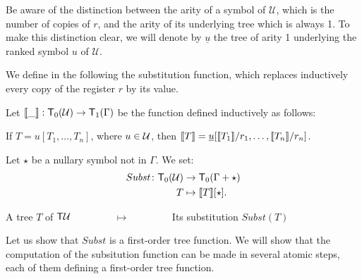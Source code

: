 Be aware of the distinction between the arity of a symbol of $\mathcal{U}$, which is the number of copies of $r$, and the arity of its underlying tree which is always 1. To make this distinction clear, we will denote by $\underline{u}$ the tree of arity 1 underlying the ranked symbol $u$ of $\mathcal{U}$. 

We define in the following the substitution function, which replaces inductively every copy of the register $r$ by its value.
\begin{definition}
Let $\llbracket \_ \rrbracket:\mathsf T_0({\mathcal U})\to \mathsf T_1(\Gamma)$ be the function defined inductively as follows:

If $T=u[T_1,\dots,T_n]$, where $u\in{\mathcal U}$, then $\llbracket T \rrbracket=\underline{u}[\llbracket T_1 \rrbracket/r_1,\dots,\llbracket T_n \rrbracket/r_n]$. 


\noindent Let $\star$ be a nullary symbol not in $\Gamma$. We set: 
\begin{align*}
  Subst \colon\mathsf T_0({\mathcal U}) &\to \mathsf T_0(\Gamma+\star)\\
  T &\mapsto \llbracket T \rrbracket[\star].
\end{align*} 
\end{definition}

\begin{example}
\begin{center}
A tree $T$ of $\mathsf T {\mathcal U}$ $\qquad\qquad\mapsto\qquad\qquad$ Its substitution $Subst(T)$ 
\end{center}
\end{example}

Let us show that $Subst$ is a first-order tree function. We will show that the computation of the subsitution function can be made in several atomic steps, each of them defining a first-order tree function.
 
